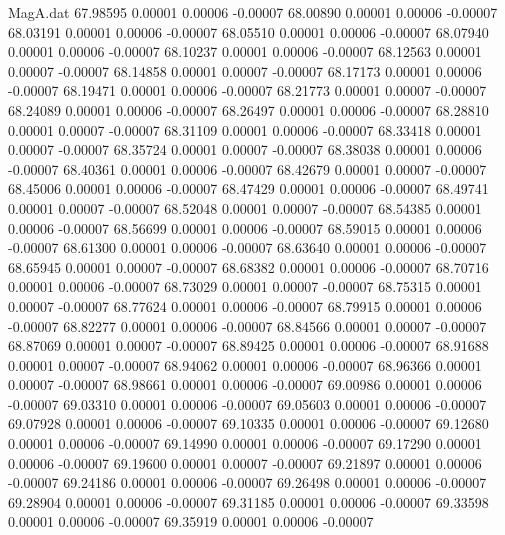 \begin{filecontents}{MagA.dat}
  67.98595    0.00001    0.00006   -0.00007
  68.00890    0.00001    0.00006   -0.00007
  68.03191    0.00001    0.00006   -0.00007
  68.05510    0.00001    0.00006   -0.00007
  68.07940    0.00001    0.00006   -0.00007
  68.10237    0.00001    0.00006   -0.00007
  68.12563    0.00001    0.00007   -0.00007
  68.14858    0.00001    0.00007   -0.00007
  68.17173    0.00001    0.00006   -0.00007
  68.19471    0.00001    0.00006   -0.00007
  68.21773    0.00001    0.00007   -0.00007
  68.24089    0.00001    0.00006   -0.00007
  68.26497    0.00001    0.00006   -0.00007
  68.28810    0.00001    0.00007   -0.00007
  68.31109    0.00001    0.00006   -0.00007
  68.33418    0.00001    0.00007   -0.00007
  68.35724    0.00001    0.00007   -0.00007
  68.38038    0.00001    0.00006   -0.00007
  68.40361    0.00001    0.00006   -0.00007
  68.42679    0.00001    0.00007   -0.00007
  68.45006    0.00001    0.00006   -0.00007
  68.47429    0.00001    0.00006   -0.00007
  68.49741    0.00001    0.00007   -0.00007
  68.52048    0.00001    0.00007   -0.00007
  68.54385    0.00001    0.00006   -0.00007
  68.56699    0.00001    0.00006   -0.00007
  68.59015    0.00001    0.00006   -0.00007
  68.61300    0.00001    0.00006   -0.00007
  68.63640    0.00001    0.00006   -0.00007
  68.65945    0.00001    0.00007   -0.00007
  68.68382    0.00001    0.00006   -0.00007
  68.70716    0.00001    0.00006   -0.00007
  68.73029    0.00001    0.00007   -0.00007
  68.75315    0.00001    0.00007   -0.00007
  68.77624    0.00001    0.00006   -0.00007
  68.79915    0.00001    0.00006   -0.00007
  68.82277    0.00001    0.00006   -0.00007
  68.84566    0.00001    0.00007   -0.00007
  68.87069    0.00001    0.00007   -0.00007
  68.89425    0.00001    0.00006   -0.00007
  68.91688    0.00001    0.00007   -0.00007
  68.94062    0.00001    0.00006   -0.00007
  68.96366    0.00001    0.00007   -0.00007
  68.98661    0.00001    0.00006   -0.00007
  69.00986    0.00001    0.00006   -0.00007
  69.03310    0.00001    0.00006   -0.00007
  69.05603    0.00001    0.00006   -0.00007
  69.07928    0.00001    0.00006   -0.00007
  69.10335    0.00001    0.00006   -0.00007
  69.12680    0.00001    0.00006   -0.00007
  69.14990    0.00001    0.00006   -0.00007
  69.17290    0.00001    0.00006   -0.00007
  69.19600    0.00001    0.00007   -0.00007
  69.21897    0.00001    0.00006   -0.00007
  69.24186    0.00001    0.00006   -0.00007
  69.26498    0.00001    0.00006   -0.00007
  69.28904    0.00001    0.00006   -0.00007
  69.31185    0.00001    0.00006   -0.00007
  69.33598    0.00001    0.00006   -0.00007
  69.35919    0.00001    0.00006   -0.00007

\end{filecontents}
